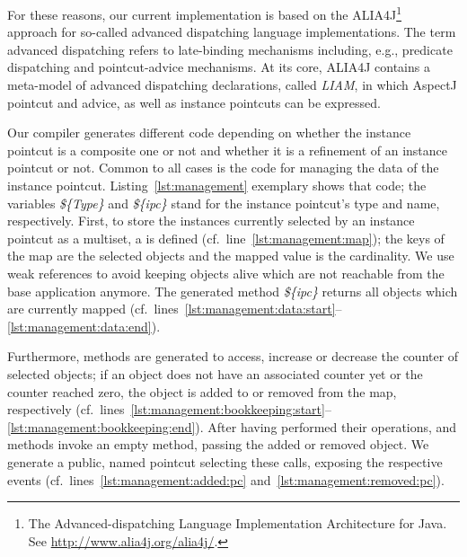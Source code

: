For these reasons, our current implementation is based on the ALIA4J\footnote{The Advanced-dispatching Language Implementation Architecture for Java. See \url{http://www.alia4j.org/alia4j/}.}~\cite{Bockisch2012} approach for so-called advanced dispatching language implementations.
The term advanced dispatching refers to late-binding mechanisms including, e.g., predicate dispatching and pointcut-advice mechanisms.
At its core, ALIA4J contains a meta-model of advanced dispatching declarations, called \emph{LIAM}, in which AspectJ pointcut and advice, as well as instance pointcuts can be expressed.

Our compiler generates different code depending on whether the instance pointcut is a composite one or not and whether it is a refinement of an instance pointcut or not.
Common to all cases is the code for managing the data of the instance pointcut.
Listing~\ref{lst:management} exemplary shows that code; the variables \emph{\$\{Type\}} and \emph{\$\{ipc\}} stand for the instance pointcut's type and name, respectively.
First, to store the instances currently selected by an instance pointcut as a multiset, a  is defined (cf.\ line~\ref{lst:management:map}); the keys of the map are the selected objects and the mapped value is the cardinality.
We use weak references to avoid keeping objects alive which are not reachable from the base application anymore.
The generated method \emph{\$\{ipc\}} returns all objects which are currently mapped (cf.\ lines~\ref{lst:management:data:start}--\ref{lst:management:data:end}).

Furthermore, methods are generated to access, increase or decrease the counter of selected objects; if an object does not have an associated counter yet or the counter reached zero, the object is added to or removed from the map, respectively (cf.\ lines~\ref{lst:management:bookkeeping:start}--\ref{lst:management:bookkeeping:end}).
After having performed their operations,  and  methods invoke an empty method, passing the added or removed object.
We generate a public, named pointcut selecting these calls, exposing the respective events (cf.\ lines~\ref{lst:management:added:pc} and~\ref{lst:management:removed:pc}).

